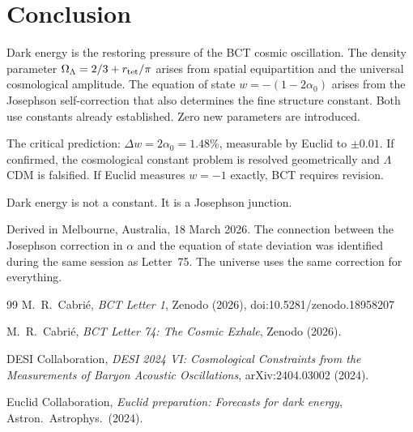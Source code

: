 \documentclass[aps,prl,twocolumn,showpacs,superscriptaddress]{revtex4-2}
\begin{document}
\section{Conclusion}

Dark energy is the restoring pressure of the BCT cosmic oscillation. The density 
parameter $\Omega_\Lambda = 2/3 + r_{\rm tet}/\pi$ arises from spatial equipartition 
and the universal cosmological amplitude. The equation of state $w = -(1-2\alpha_0)$ 
arises from the Josephson self-correction that also determines the fine structure 
constant. Both use constants already established. Zero new parameters are introduced.

The critical prediction: $\Delta w = 2\alpha_0 = 1.48\%$, measurable by Euclid 
to $\pm 0.01$. If confirmed, the cosmological constant problem is resolved 
geometrically and $\Lambda$CDM is falsified. If Euclid measures $w=-1$ exactly, 
BCT requires revision.

Dark energy is not a constant. It is a Josephson junction.

\begin{acknowledgments}
Derived in Melbourne, Australia, 18 March 2026. The connection between the 
Josephson correction in $\alpha$ and the equation of state deviation was identified 
during the same session as Letter~75. The universe uses the same correction for 
everything.
\end{acknowledgments}

\begin{thebibliography}{99}
 M.~R.~Cabri\'e, \textit{BCT Letter 1}, Zenodo (2026), 
doi:10.5281/zenodo.18958207

 M.~R.~Cabri\'e, \textit{BCT Letter 74: The Cosmic Exhale}, 
Zenodo (2026).

 DESI Collaboration, \textit{DESI 2024 VI: Cosmological 
Constraints from the Measurements of Baryon Acoustic Oscillations}, 
arXiv:2404.03002 (2024).

 Euclid Collaboration, \textit{Euclid preparation: 
Forecasts for dark energy}, Astron.~Astrophys.~(2024).
\end{thebibliography}
\end{document}
